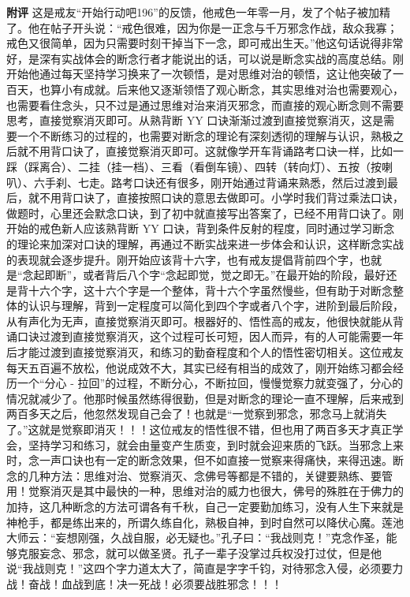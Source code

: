 \begin{case}
    \textbf{附评} 这是戒友“开始行动吧196”的反馈，他戒色一年零一月，发了个帖子被加精了。他在帖子开头说：“戒色很难，因为你是一正念与千万邪念作战，敌众我寡；戒色又很简单，因为只需要时刻干掉当下一念，即可戒出生天。”他这句话说得非常好，是深有实战体会的断念行者才能说出的话，可以说是断念实战的高度总结。刚开始他通过每天坚持学习换来了一次顿悟，是对思维对治的顿悟，这让他突破了一百天，也算小有成就。后来他又逐渐领悟了观心断念，其实思维对治也需要观心，也需要看住念头，只不过是通过思维对治来消灭邪念，而直接的观心断念则不需要思考，直接觉察消灭即可。从熟背断 YY 口诀渐渐过渡到直接觉察消灭，这是需要一个不断练习的过程的，也需要对断念的理论有深刻透彻的理解与认识，熟极之后就不用背口诀了，直接觉察消灭即可。这就像学开车背诵路考口诀一样，比如一踩（踩离合）、二挂（挂一档）、三看（看倒车镜）、四转（转向灯）、五按（按喇叭）、六手刹、七走。路考口诀还有很多，刚开始通过背诵来熟悉，然后过渡到最后，就不用背口诀了，直接按照口诀的意思去做即可。小学时我们背过乘法口诀，做题时，心里还会默念口诀，到了初中就直接写出答案了，已经不用背口诀了。刚开始的戒色新人应该熟背断 YY 口诀，背到条件反射的程度，同时通过学习断念的理论来加深对口诀的理解，再通过不断实战来进一步体会和认识，这样断念实战的表现就会逐步提升。刚开始应该背十六字，也有戒友提倡背前四个字，也就是“念起即断”，或者背后八个字“念起即觉，觉之即无。”在最开始的阶段，最好还是背十六个字，这十六个字是一个整体，背十六个字虽然慢些，但有助于对断念整体的认识与理解，背到一定程度可以简化到四个字或者八个字，进阶到最后阶段，从有声化为无声，直接觉察消灭即可。根器好的、悟性高的戒友，他很快就能从背诵口诀过渡到直接觉察消灭，这个过程可长可短，因人而异，有的人可能需要一年后才能过渡到直接觉察消灭，和练习的勤奋程度和个人的悟性密切相关。这位戒友每天五百遍不放松，他说成效不大，其实已经有相当的成效了，刚开始练习都会经历一个“分心 - 拉回”的过程，不断分心，不断拉回，慢慢觉察力就变强了，分心的情况就减少了。他那时候虽然练得很勤，但是对断念的理论一直不理解，后来戒到两百多天之后，他忽然发现自己会了！也就是“一觉察到邪念，邪念马上就消失了。”这就是觉察即消灭！！！这位戒友的悟性很不错，但也用了两百多天才真正学会，坚持学习和练习，就会由量变产生质变，到时就会迎来质的飞跃。当邪念上来时，念一声口诀也有一定的断念效果，但不如直接一觉察来得痛快，来得迅速。断念的几种方法：思维对治、觉察消灭、念佛号等都是不错的，关键要熟练、要管用！觉察消灭是其中最快的一种，思维对治的威力也很大，佛号的殊胜在于佛力的加持，这几种断念的方法可谓各有千秋，自己一定要勤加练习，没有人生下来就是神枪手，都是练出来的，所谓久练自化，熟极自神，到时自然可以降伏心魔。莲池大师云：“妄想刚强，久战自服，必无疑也。”孔子曰：“我战则克！”克念作圣，能够克服妄念、邪念，就可以做圣贤。孔子一辈子没掌过兵权没打过仗，但是他说“我战则克！”这四个字力道太大了，简直是字字千钧，对待邪念入侵，必须要力战！奋战！血战到底！决一死战！必须要战胜邪念！！！
\end{case}

